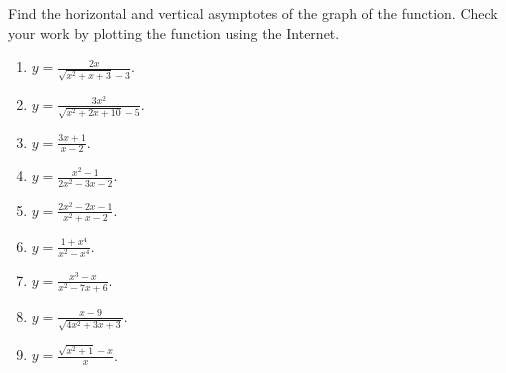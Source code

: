 Find the horizontal and vertical asymptotes of the graph of the function. Check your work by plotting the function using the Internet.
\begin{multicols}{2}
\begin{enumerate}[ref={\fcProblemRef}]

\item \label{problemAsymptotesy=(2x/(sqrt(x^2+x+3)-3))} $\displaystyle y=\frac{2x}{\sqrt{x^2+x+3}-3}$. 

\item $\displaystyle y=\frac{3x^2}{\sqrt{x^2+2x+10}-5}$. 

\item $\displaystyle y=\frac{3x+1}{x-2}$.

\item $\displaystyle y=\frac{x^2-1}{2x^2-3x-2}$.

\item $\displaystyle y=\frac{2x^2-2x-1}{x^2+x-2}$.

\item $\displaystyle y=\frac{1+x^4}{x^2-x^4}$.

\item $\displaystyle y=\frac{x^3-x}{x^2-7x+6}$.

\item $\displaystyle y=\frac{x-9}{\sqrt{4x^2+3x+3}}$.


\item $\displaystyle y=\frac{\sqrt{x^2+1}- x }{x}$.


\end{enumerate}
\end{multicols}